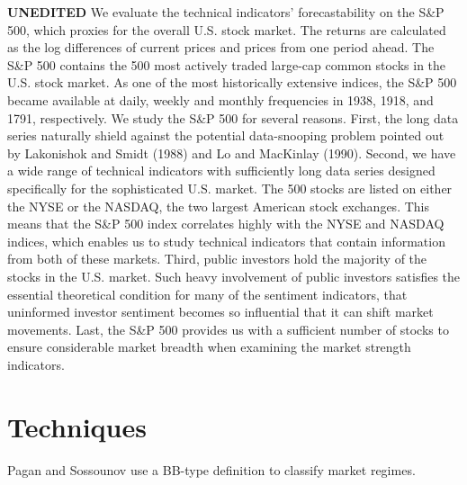 \documentclass[]{book}
\begin{document}
\textbf{UNEDITED}
We evaluate the technical indicators' forecastability on the S\&P 500, which proxies for the overall U.S. stock market. The returns are calculated as the log differences of current prices and prices from one period ahead. The S\&P 500 contains the 500 most
actively traded large-cap common stocks in the U.S. stock market. As one of the most
historically extensive indices, the S\&P 500 became available at daily, weekly and
monthly frequencies in 1938, 1918, and 1791, respectively.
We study the S\&P 500 for several reasons. First, the long data series naturally shield against the potential data-snooping problem pointed out by Lakonishok and Smidt (1988) and Lo and MacKinlay (1990). Second, we have a wide range of technical indicators with sufficiently long data series designed specifically for the sophisticated U.S. market. The 500 stocks are listed on either the NYSE or the NASDAQ, the two largest American stock exchanges. This means that the S\&P 500 index correlates highly with the NYSE and NASDAQ indices, which enables us to study technical indicators that contain information from both of these markets. Third, public investors hold the majority of the stocks in the U.S. market. Such heavy involvement of public investors satisfies the essential theoretical condition for many of the sentiment indicators, that uninformed investor sentiment becomes so influential that it can shift market movements. Last, the S\&P 500 provides us with a sufficient number of stocks to ensure considerable market breadth when examining the market strength indicators.

\citep{fang2014technical}

\hypertarget{techniques}{%
\section{Techniques}\label{techniques}}

Pagan and Sossounov \citeyearpar{pagan2003simple} use a BB-type definition \citeyearpar{granger1972cyclical} to classify market regimes.
\end{document}
